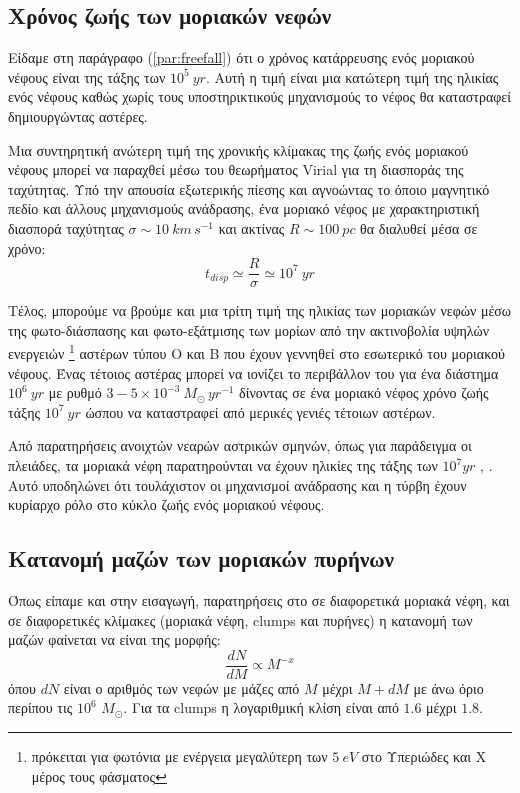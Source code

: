 \documentclass[a4paper,12pt]{memoir}
\newcommand{\sm}{$M_{\odot}$}
\begin{document}
\subsection{Χρόνος ζωής των μοριακών νεφών}
\label{par:MCtc}
Είδαμε στη παράγραφο (\ref{par:freefall}) ότι ο χρόνος κατάρρευσης ενός μοριακού νέφους είναι της τάξης των $10^5 \ yr$. Αυτή η τιμή είναι μια κατώτερη τιμή της ηλικίας ενός νέφους καθώς χωρίς τους υποστηρικτικούς μηχανισμούς το νέφος θα καταστραφεί δημιουργώντας αστέρες.

Μια συντηρητική ανώτερη τιμή της χρονικής κλίμακας της ζωής ενός μοριακού νέφους μπορεί να παραχθεί μέσω του θεωρήματος Virial για τη διασποράς της ταχύτητας. Υπό την απουσία εξωτερικής πίεσης και αγνοώντας το όποιο μαγνητικό πεδίο και άλλους μηχανισμούς ανάδρασης, ένα μοριακό νέφος με χαρακτηριστική διασπορά ταχύτητας $\sigma \sim 10 \ km \, s^{-1}$ και ακτίνας $R \sim 100 \ pc$ θα διαλυθεί μέσα σε χρόνο:
\begin{equation}
t_{disp} \simeq \frac{R}{\sigma} \simeq 10^7 \ yr
\end{equation} 

Τέλος, μπορούμε να βρούμε και μια τρίτη τιμή της ηλικίας των μοριακών νεφών μέσω της φωτο-διάσπασης και φωτο-εξάτμισης των μορίων από την ακτινοβολία υψηλών ενεργειών \footnote{πρόκειται για φωτόνια με ενέργεια μεγαλύτερη των $5 \ eV$ στο Υπεριώδες και X μέρος τους φάσματος} αστέρων τύπου O και B που έχουν γεννηθεί στο εσωτερικό του μοριακού νέφους. Ένας τέτοιος αστέρας μπορεί να ιονίζει το περιβάλλον του για ένα διάστημα $10^6 \ yr$ με ρυθμό $3-5 \times 10^{-3} \ M_{\odot} \, yr^{-1}$ δίνοντας σε ένα μοριακό νέφος χρόνο ζωής τάξης $10^7 \ yr$ ώσπου να καταστραφεί από μερικές γενιές τέτοιων αστέρων.

Από παρατηρήσεις ανοιχτών νεαρών αστρικών σμηνών, όπως για παράδειγμα οι πλειάδες, τα μοριακά νέφη παρατηρούνται να έχουν ηλικίες της τάξης των $10^7 yr$ \cite{bash_1977}, \cite{leisawitz_1989}.
Αυτό υποδηλώνει ότι τουλάχιστον οι μηχανισμοί ανάδρασης και η τύρβη έχουν κυρίαρχο ρόλο στο κύκλο ζωής ενός μοριακού νέφους.

\subsection{Κατανομή μαζών των μοριακών πυρήνων} 
Όπως είπαμε και στην εισαγωγή, παρατηρήσεις στο  σε διαφορετικά μοριακά νέφη, και σε διαφορετικές κλίμακες (μοριακά νέφη, clumps και πυρήνες) η κατανομή των μαζών φαίνεται να είναι της μορφής:
\begin{equation}
\frac{dN}{dM} \propto M^{-x}
\end{equation}
όπου $dN$ είναι ο αριθμός των νεφών με μάζες από $M$ μέχρι $M+dM$ με άνω όριο περίπου τις $10^6$ \sm. Για τα clumps η λογαριθμική κλίση είναι από $1.6$ μέχρι $1.8$.
\end{document}
